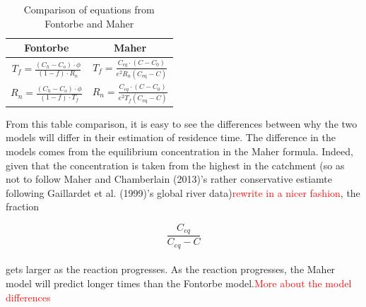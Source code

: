 \begin{table}[h]
    \centering
    \renewcommand{\arraystretch}{2.2} %
    \begin{tabular}{cc}
        \toprule
        \textbf{Fontorbe} & \textbf{Maher} \\
        \midrule
        $\displaystyle T_f  = \frac{\left(C_h - C_o\right)\cdot\phi}{\left(1-f\right)\cdot R_n}$ & 
        $\displaystyle T_f = \frac{C_{eq} \cdot \left(C - C_0\right)}{e^2 R_n \left( C_{\text{eq}} - C \right)}$ \\ [10pt]
        $\displaystyle R_n  = \frac{\left(C_h - C_o\right)\cdot\phi}{\left(1-f\right)\cdot T_f}$ & 
        $\displaystyle R_n = \frac{C_{eq} \cdot \left(C - C_0\right)}{e^2 T_f \left( C_{\text{eq}} - C \right)}$ \\
        \bottomrule
    \end{tabular}
    \caption{Comparison of equations from Fontorbe and Maher}
    \label{tab:equations}
\end{table}


From this table comparison, it is easy to see the differences between why the two models will differ in their estimation of residence time. The difference in the models comes from the equilibrium concentration in the Maher formula. Indeed, given that the concentration is taken from the highest in the catchment (so as not to follow Maher and Chamberlain (2013)'s rather conservative estiamte following Gaillardet et al. (1999)'s global river data)\textcolor{red}{rewrite in a nicer fashion}, the fraction

\[
\frac{C_{eq}}{C_{eq} - C}
\]\\

gets larger as the reaction progresses. As the reaction progresses, the Maher model will predict longer times than the Fontorbe model.\textcolor{red}{More about the model differences}\\ 


